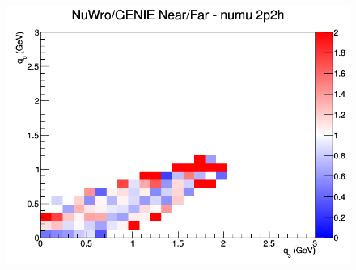 \documentclass[12pt]{article}
\begin{document}
\begin{figure}[h]
\endminipage
{}
\includegraphics[width=\linewidth]{eff_q0_q3/FGT/ratios/2p2h_NuWro_GENIE_numu_NF_q3_q0.png}
\endminipage
\newline
\end{figure}
\clearpage
\end{document}
